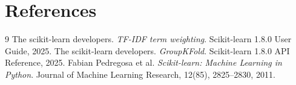\documentclass[12pt]{article}
\begin{document}
\section{References}
{\renewcommand{\section}[2]{}%
\begin{thebibliography}{9}
 The scikit-learn developers. \emph{TF-IDF term
weighting}. Scikit-learn 1.8.0 User Guide, 2025.
 The scikit-learn developers. \emph{GroupKFold}.
Scikit-learn 1.8.0 API Reference, 2025.
 Fabian Pedregosa et al. \emph{Scikit-learn: Machine
Learning in Python}. Journal of Machine Learning Research, 12(85),
2825--2830, 2011.
\end{thebibliography}}
\end{document}
